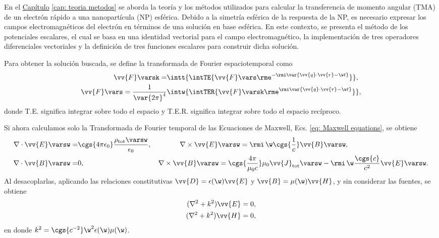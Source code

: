 \label{AppendixScalarPotentials}

En el \hyperref[cap: teoria metodos]{Capítulo} \ref{cap: teoria metodos} se aborda la teoría y los métodos utilizados para calcular la transferencia de momento angular (TMA) de un electrón rápido a una nanopartícula (NP) esférica. Debido a la simetría esférica de la respuesta de la NP, es necesario expresar los campos electromagnéticos del electrón en términos de una solución en base esférica. En este contexto, se presenta el método de los potenciales escalares, el cual se basa en una identidad vectorial para el campo electromagnético, la implementación de tres operadores diferenciales vectoriales y la definición de tres funciones escalares para construir dicha solución.

Para obtener la solución buscada, se define la transformada de Fourier espaciotemporal como
\begin{align}
\vv{F}\varsk = &\intt{\intTE{ \vv{F}\vars \rme^{-\rmi \var{\vv{q}\cdot\vv{r}-\w t}} }},\nonumber \\
\vv{F}\vars = \frac{1}{\var{2\pi}^4}&\intw{\intTER{ \vv{F}\varsk \rme^{\rmi\var{\vv{q}\cdot\vv{r}-\w t}} }},
\end{align}
donde T.E. significa integrar sobre todo el espacio y T.E.R. significa integrar sobre todo el espacio recíproco. 

Si ahora calculamos solo la Transformada de Fourier temporal de las Ecuaciones de Maxwell, Ecs. \eqref{eq: Maxwell equations}, se obtiene
\begin{align}
\nabla\cdot\vv{E}\varsw =& \cgs{4\pi\epsilon_0}\frac{\rho_{\text{tot}}\varsw}{\epsilon_0}, \qquad \qquad \nabla\times\vv{E}\varsw= \rmi \,\w\cgs{\frac{1}{c}}\vv{B}\varsw, \nonumber \\
\nabla\cdot\vv{B}\varsw =& 0, \qquad \qquad \qquad \qquad \quad \quad \,\,\, \nabla\times\vv{B}\varsw=\cgs{\frac{4\pi}{\mu_0 c}}\mu_0\vv{J}_{\text{tot}}\varsw- \rmi \, \w\frac{\cgs{c}}{c^2}\vv{E}\varsw.
\label{eq: Maxwell equations freq}
\end{align}
Al desacoplarlas, aplicando las relaciones constitutivas $\vv{D}=\epsilon(\w)\vv{E}$ y $\vv{B} = \mu(\w) \vv{H}$, y sin considerar las fuentes, se obtiene
\begin{align*}
(\nabla^2 + k^2)\vv{E} = 0, \\
(\nabla^2 + k^2)\vv{H} = 0,
\end{align*}
en donde $k^2= \cgs{c^{-2}} \w^2 \epsilon(\w) \mu(\w)$.

